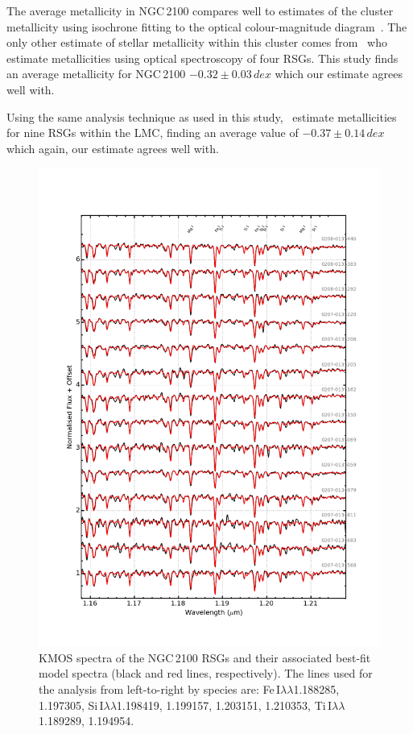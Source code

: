 \documentclass[useAMS,usenatbib]{mn2e}
\begin{document}
The average metallicity in NGC\,2100 compares well to estimates of the cluster metallicity using isochrone fitting to the optical colour-magnitude diagram~\citep[$-0.34\,dex$;][]{2015A&A...575A..62N}.
The only other estimate of stellar metallicity within this cluster comes from~\cite{1994A&A...282..717J}
who estimate metallicities using optical spectroscopy of four RSGs.
This study finds an average metallicity for NGC\,2100 $-0.32\pm0.03\,dex$ which our estimate agrees well with.

Using the same analysis technique as used in this study,~\cite{2015ApJ...806...21D} estimate metallicities for nine RSGs within the LMC, finding an average value of $-0.37\pm0.14\,dex$ which again,
our estimate agrees well with.


\begin{figure}
 \begin{center}
\includegraphics[width=16cm]{NGC2100-model-fits}
\caption{KMOS spectra of the NGC\,2100 RSGs and their associated best-fit model spectra
(black and red lines, respectively).
The lines used for the analysis from left-to-right by species are:
Fe\,I$\lambda\lambda$1.188285,
1.197305,
Si\,I$\lambda\lambda$1.198419,
1.199157,
1.203151,
1.210353,
Ti\,I$\lambda\lambda$1.189289,
1.194954.
         }
\label{fig:model_fits}
\end{center}
\end{figure}
\end{document}
